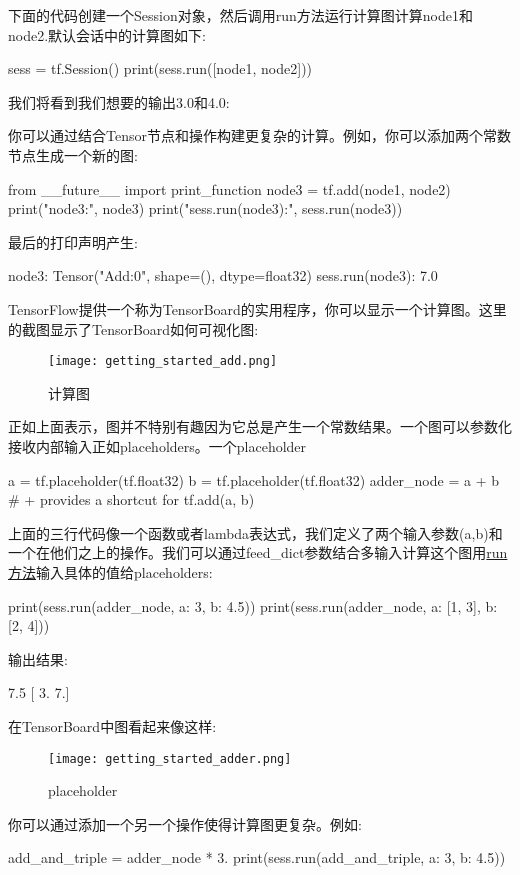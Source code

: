 下面的代码创建一个Session对象，然后调用run方法运行计算图计算node1和node2.默认会话中的计算图如下:
\begin{pythoncode}
sess = tf.Session()
print(sess.run([node1, node2]))
\end{pythoncode}
我们将看到我们想要的输出3.0和4.0:
\begin{pythoncode}
[3.0,4.0]
\end{pythoncode}
你可以通过结合Tensor节点和操作构建更复杂的计算。例如，你可以添加两个常数节点生成一个新的图:
\begin{pythoncode}
from __future__ import print_function
node3 = tf.add(node1, node2)
print("node3:", node3)
print("sess.run(node3):", sess.run(node3))
\end{pythoncode}
最后的打印声明产生:
\begin{pythoncode}
node3: Tensor("Add:0", shape=(), dtype=float32)
sess.run(node3): 7.0
\end{pythoncode}
TensorFlow提供一个称为TensorBoard的实用程序，你可以显示一个计算图。这里的截图显示了TensorBoard如何可视化图:
\begin{figure}[H]
\centering
\texttt{[image: getting\_started\_add.png]}
\caption{计算图}
\end{figure}
正如上面表示，图并不特别有趣因为它总是产生一个常数结果。一个图可以参数化接收内部输入正如placeholders。一个placeholder
\begin{pythoncode}
a = tf.placeholder(tf.float32)
b = tf.placeholder(tf.float32)
adder_node = a + b  # + provides a shortcut for tf.add(a, b)
\end{pythoncode}
上面的三行代码像一个函数或者lambda表达式，我们定义了两个输入参数(a,b)和一个在他们之上的操作。我们可以通过feed\_dict参数结合多输入计算这个图用\href{https://www.tensorflow.org/api_docs/python/tf/Session#run}{run方法}输入具体的值给placeholders:
\begin{pythoncode}
print(sess.run(adder_node, {a: 3, b: 4.5}))
print(sess.run(adder_node, {a: [1, 3], b: [2, 4]}))
\end{pythoncode}
输出结果:
\begin{pythoncode}
7.5
[ 3.  7.]
\end{pythoncode}
在TensorBoard中图看起来像这样:
\begin{figure}[H]
\centering
\texttt{[image: getting\_started\_adder.png]}
\caption{placeholder}
\end{figure}
你可以通过添加一个另一个操作使得计算图更复杂。例如:
\begin{pythoncode}
add_and_triple = adder_node * 3.
print(sess.run(add_and_triple, {a: 3, b: 4.5}))
\end{pythoncode}
